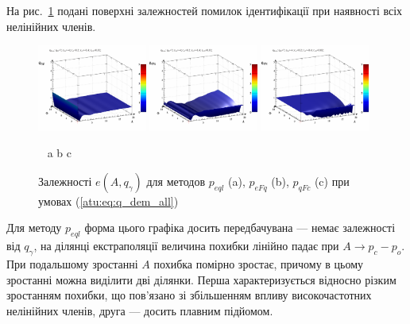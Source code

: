 На рис.~\ref{atu:f:qsl_pe_A_qg_all} подані поверхні залежностей помилок ідентифікації
при наявності всіх нелінійних членів.


\begin{figure}[htb!]
  \begin{center}
    \includegraphics[width=0.32\textwidth]{p/qls_pe-p_A_qg_eql_all.png}
    \hfill
    \includegraphics[width=0.32\textwidth]{p/qls_pe-p_A_qg_eFq_all.png}
    \hfill
    \includegraphics[width=0.32\textwidth]{p/qls_pe-p_A_qg_eFc_all.png}
  \end{center}
  \vspace{-1.5ex}
  \begin{center}
    ~ \hfill a \hfill\hfill b \hfill\hfill c \hfill ~
  \end{center}
  \vspace{-2.5ex}
  \caption{Залежності $e(A,q_\gamma)$ для методов $p_{eql}$ (a), $p_{eFq}$ (b), $p_{qFc}$ (c) при умовах (\ref{atu:eq:q_dem_all})}
  \label{atu:f:qsl_pe_A_qg_all}
\end{figure}

Для методу $p_{eql}$ форма цього графіка досить передбачувана --- немає
залежності від $q_\gamma$, на ділянці екстраполяції величина похибки
лінійно падає при $A \to p_c - p_o$. При подальшому зростанні $A$ похибка
помірно зростає, причому в цьому зростанні можна виділити дві ділянки. Перша
характеризується відносно різким зростанням похибки, що пов'язано зі збільшенням
впливу високочастотних нелінійних членів, друга --- досить плавним підйомом.

